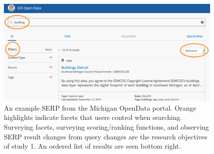 \begin{figure}[H]
    \centering
    \includegraphics[width=1\textwidth]{../figures/Methods_OpenData.png}
    \caption{An example SERP from the Michigan OpenData portal. Orange highlights indicate facets that users control when searching. Surveying facets, surveying scoring/ranking functions, and observing SERP result changes from query changes are the research objectives of study 1. An ordered list of results are seen bottom right.}
    \label{fig:Methods_OpenData}
\end{figure}

